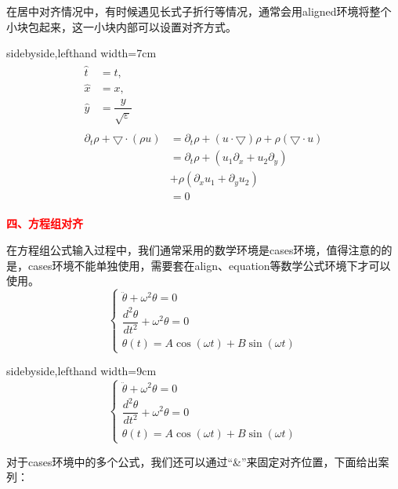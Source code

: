 \documentclass[UTF8,
no-math,
12pt,
openany,
table,
dvipsnames,
svgnames]{article}
\begin{document}
在居中对齐情况中，有时候遇见长式子折行等情况，通常会用aligned环境将整个小块包起来，这一小块内部可以设置对齐方式。

\begin{tcblisting}{sidebyside,lefthand width=7cm}
\begin{gather*}
\begin{aligned}
\hat{t}&=t,\\\hat{x}&=x,\\\hat{y}&=
\dfrac{y}{\sqrt{\varepsilon}}
\end{aligned}\\ \begin{aligned}
\partial_{t}\rho+\bigtriangledown
\cdot(\rho u)&=\partial_{t}\rho+
(u\cdot\bigtriangledown)\rho+
\rho(\bigtriangledown\cdot u)\\
&=\partial_{t}\rho +(u_{1}\partial_{x}+u_{2}
\partial_{y})\\&+\rho(\partial_{x} u_{1}+\partial_{y}u_{2})\\
&=0 \end{aligned}
\end{gather*}
\end{tcblisting}

\noindent
{\large\bf{\textcolor{Red}{四、方程组对齐}}}

在方程组公式输入过程中，我们通常采用的数学环境是cases环境，值得注意的的是，cases环境不能单独使用，需要套在align、equation等数学公式环境下才可以使用。
\begin{equation*}
\begin{cases}
\ddot{\theta}+\omega^2\theta =0\\
\dfrac{d^2\theta}{dt^2}+\omega^2\theta=0\\
\theta(t)=A \cos(\omega t)+B\sin(\omega t)
\end{cases}
\end{equation*}

\begin{tcblisting}{sidebyside,lefthand width=9cm}
\begin{equation*}
\begin{cases}
\ddot{\theta}+\omega^2\theta =0\\
\dfrac{d^2\theta}{dt^2}+\omega^2\theta=0\\
\theta(t)=A \cos(\omega t)+B\sin(\omega t)
\end{cases}
\end{equation*}
\end{tcblisting}

对于cases环境中的多个公式，我们还可以通过“\&”来固定对齐位置，下面给出案列：
\end{document}
